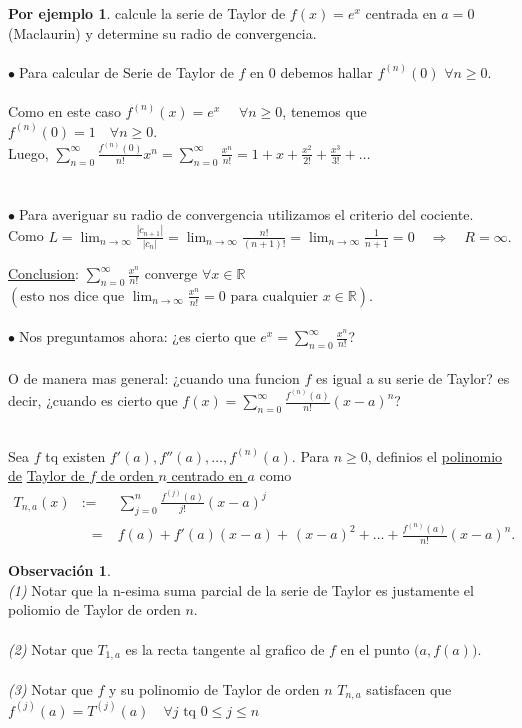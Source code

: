 \documentclass{article}
\theoremstyle{definition}
\theoremstyle{definition}
\newtheorem*{obs}{Observación}
\newtheorem*{ej}{Por ejemplo}
\theoremstyle{remark}
\newcommand\bl{$\bullet\;$}
\begin{document}
\begin{ej}
  calcule la serie de Taylor de $f(x)=e^x$ centrada en $a=0$ (Maclaurin) y determine su radio de convergencia.
\\\\
\bl Para calcular de Serie de Taylor de $f$ en $0$ debemos hallar $f^{(n)}(0)$ \quad $\forall  n \geq 0$. \\ \\
Como en este caso $f^{(n)}(x)=e^x$ $\quad \forall n \geq 0$, tenemos que $f^{(n)}(0)=1 \quad \forall n \geq 0$. \\
Luego, $\sum_{n=0}^{\infty}{\frac{f^{(n)}(0)}{n!}x^n=\sum_{n=0}^{\infty}{\frac{x^n}{n!}=1+x+\frac{x^2}{2!}+\frac{x^3}{3!}+\dots}}$
 \\ \\  \\
 \bl Para averiguar su radio de convergencia utilizamos el criterio del cociente. \\ 
 Como $L=\lim_{n\to\infty}{\frac{|c_{n+1}|}{|c_{n}|}}=\lim_{n\to\infty}{\frac{n!}{(n+1)!}}=\lim_{n\to\infty}{\frac{1}{n+1}=0} \quad \Rightarrow \quad R=\infty.$
\end{ej}

\underline{Conclusion}: $\sum_{n=0}^{\infty}{\frac{x^n}{n!}}$ converge $\forall x \in \mathbb{R}$ 
$\left(\text{esto nos dice que }\lim_{n\to\infty}{\frac{x^n}{n!}}=0\text{ para cualquier }x \in \mathbb{R}\right)$.
\\\\
\bl Nos preguntamos ahora: ¿es cierto que $e^x=\sum_{n=0}^{\infty}{\frac{x^n}{n!}}$? \\\\
O de manera mas general: ¿cuando una funcion $f$ es igual a su serie de Taylor? es decir, ¿cuando es cierto que $f(x)=\sum_{n=0}^{\infty}{\frac{f^{(n)}(a)}{n!}(x-a)^n}$?
\pagebreak
\begin{defi}
\; \\ 
Sea $f$ tq existen $f'(a), f''(a), \dots ,f^{(n)}(a).$ Para $n \geq 0$, definios el \underline{polinomio de} \underline{Taylor de $f$ de orden $n$ centrado en $a$} como \[ \begin{array}{lll}
T_{n,a}(x)& := & \sum_{j=0}^{n}{\frac{f^{(j)}(a)}{j!}(x-a)^j} \\ & \phantom{:}= & f(a)+f'(a)(x-a)+\frac{}{}(x-a)^2+\dots+\frac{f^{(n)}(a)}{n!}(x-a)^n. \end{array}
\]
\end{defi}

\begin{obs} \; \\
  \emph{(1)} Notar que la n-esima suma parcial de la serie de Taylor es justamente el poliomio de Taylor de orden $n$.
  \\\\
  \emph{(2)} Notar que $T_{1,a}$ es la recta tangente al grafico de $f$ en el punto $\big(a,f(a)\big)$.
  \\\\
  \emph{(3)} Notar que $f$ y su polinomio de Taylor de orden $n$ $T_{n,a}$ satisfacen que \\ $f^{(j)}(a)=T^{(j)}(a)\quad \forall j \text{ tq }0 \leq j \leq n$
\end{obs}
\end{document}
